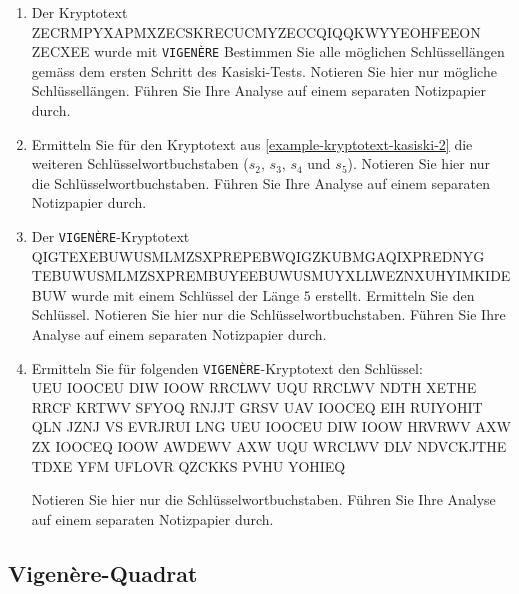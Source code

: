 \begin{enumerate}

\newpage

\item Der Kryptotext ZECRMPYXAPMXZECSKRECUCMYZECCQIQQKWYYEOHFEEON ZECXEE wurde mit \texttt{VIGENÈRE} Bestimmen Sie alle möglichen Schlüssellängen gemäss dem ersten Schritt des Kasiski-Tests. Notieren Sie hier nur mögliche Schlüssellängen. Führen Sie Ihre Analyse auf einem separaten Notizpapier durch.

\fillwithgrid{1in}

\item Ermitteln Sie für den Kryptotext aus \autoref{example-kryptotext-kasiski-2} die weiteren Schlüsselwortbuchstaben ($s_2$, $s_3$, $s_4$ und $s_5$). Notieren Sie hier nur die Schlüsselwortbuchstaben. Führen Sie Ihre Analyse auf einem separaten Notizpapier durch.

\fillwithgrid{1in}

\item Der \texttt{VIGENÈRE}-Kryptotext QIGTEXEBUWUSMLMZSXPREPEBWQIGZKUBMGAQIXPREDNYG TEBUWUSMLMZSXPREMBUYEEBUWUSMUYXLLWEZNXUHYIMKIDEBUW wurde mit einem Schlüssel der Länge $5$ erstellt. Ermitteln Sie den Schlüssel. Notieren Sie hier nur die Schlüsselwortbuchstaben. Führen Sie Ihre Analyse auf einem separaten Notizpapier durch.

\fillwithgrid{1in}

\item Ermitteln Sie für folgenden \texttt{VIGENÈRE}-Kryptotext den Schlüssel: \\
UEU IOOCEU DIW IOOW RRCLWV UQU RRCLWV NDTH XETHE RRCF KRTWV SFYOQ RNJJT GRSV UAV IOOCEQ EIH RUIYOHIT QLN JZNJ VS EVRJRUI LNG UEU IOOCEU DIW IOOW HRVRWV AXW ZX IOOCEQ IOOW AWDEWV AXW UQU WRCLWV DLV NDVCKJTHE TDXE YFM UFLOVR QZCKKS PVHU YOHIEQ

Notieren Sie hier nur die Schlüsselwortbuchstaben. Führen Sie Ihre Analyse auf einem separaten Notizpapier durch.

\fillwithgrid{1in}

\end{enumerate}

\newpage

\subsection{Vigenère-Quadrat}

